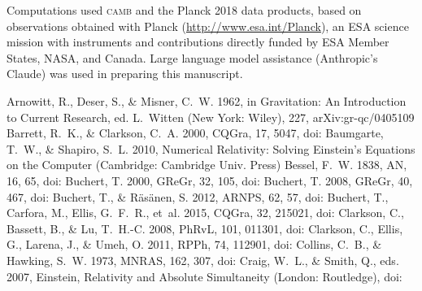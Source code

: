 \documentclass[twocolumn]{aastex701}
\begin{document}
\begin{acknowledgments}
Computations used \textsc{camb} and the Planck 2018 data products, based on observations obtained with Planck (\url{http://www.esa.int/Planck}), an ESA science mission with instruments and contributions directly funded by ESA Member States, NASA, and Canada. Large language model assistance (Anthropic's Claude) was used in preparing this manuscript.
\end{acknowledgments}



\begin{thebibliography}{}

 Arnowitt, R., Deser, S., \& Misner, C.~W. 1962, in Gravitation: An Introduction to Current Research, ed. L.~Witten (New York: Wiley), 227, arXiv:gr-qc/0405109
 Barrett, R.~K., \& Clarkson, C.~A. 2000, CQGra, 17, 5047, doi:
 Baumgarte, T.~W., \& Shapiro, S.~L. 2010, Numerical Relativity: Solving Einstein's Equations on the Computer (Cambridge: Cambridge Univ. Press)
 Bessel, F.~W. 1838, AN, 16, 65, doi:
 Buchert, T. 2000, GReGr, 32, 105, doi:
 Buchert, T. 2008, GReGr, 40, 467, doi:
 Buchert, T., \& R{\"a}s{\"a}nen, S. 2012, ARNPS, 62, 57, doi:
 Buchert, T., Carfora, M., Ellis, G.~F.~R., {et~al.} 2015, CQGra, 32, 215021, doi:
 Clarkson, C., Bassett, B., \& Lu, T.~H.-C. 2008, PhRvL, 101, 011301, doi:
 Clarkson, C., Ellis, G., Larena, J., \& Umeh, O. 2011, RPPh, 74, 112901, doi:
 Collins, C.~B., \& Hawking, S.~W. 1973, MNRAS, 162, 307, doi:
 Craig, W.~L., \& Smith, Q., eds. 2007, Einstein, Relativity and Absolute Simultaneity (London: Routledge), doi:

\end{thebibliography}
\end{document}
